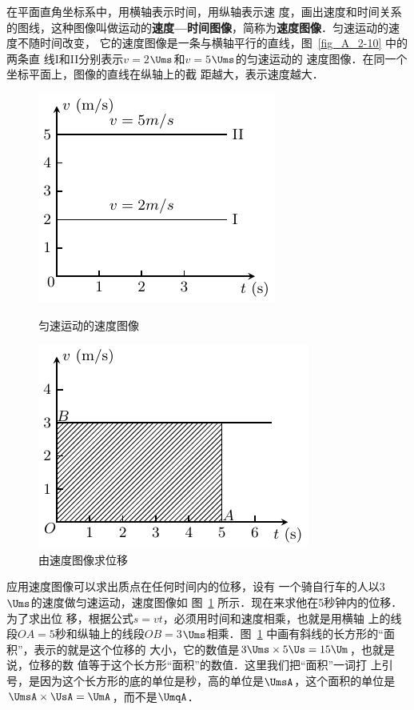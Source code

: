在平面直角坐标系中，用横轴表示时间，用纵轴表示速
度，画出速度和时间关系的图线，这种图像叫做运动的\textbf{速度—时间图像}，简称为\textbf{速度图像}．匀速运动的速度不随时间改变，
它的速度图像是一条与横轴平行的直线，图~\ref{fig_A_2-10} 中的两条直
线I和II分别表示$v=2$$\Ums$和$v=5$$\Ums$的匀速运动的
速度图像．在同一个坐标平面上，图像的直线在纵轴上的截
距越大，表示速度越大．
\begin{figure}[htp]
    \centering
    \begin{minipage}[t]{0.48\textwidth}
        \centering
        \includegraphics{fig/A/2-10.pdf}
        \caption{匀速运动的速度图像}\label{fig_A_2-10}
    \end{minipage}
    \begin{minipage}[t]{0.48\textwidth}
        \centering
        \includegraphics{fig/A/2-11.pdf}
        \caption{由速度图像求位移}\label{fig_A_2-11}
    \end{minipage}
\end{figure}

应用速度图像可以求出质点在任何时间内的位移，设有
一个骑自行车的人以3$\Ums$的速度做匀速运动，速度图像如
图~\ref{fig_A_2-11} 所示．现在来求他在5秒钟内的位移．为了求出位
移，根据公式$s=vt$，必须用时间和速度相乘，也就是用横轴
上的线段$OA=5$秒和纵轴上的线段$OB=3$$\Ums$相乘．图~\ref{fig_A_2-11} 
中画有斜线的长方形的“面积”，表示的就是这个位移的
大小，它的数值是$3 \Ums \times 5 \Us = 15 \Um$，也就是说，位移的数
值等于这个长方形“面积”的数值．这里我们把“面积”一词打
上引号，是因为这个长方形的底的单位是秒，高的单位是$\UmsA$，这个面积的单位是$\UmsA \times \UsA= \UmA $，而不是$ \UmqA $．

